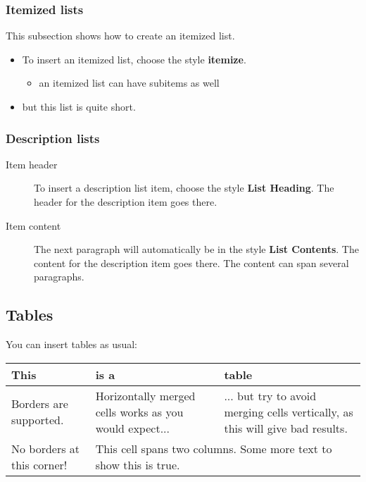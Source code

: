 \documentclass[12pt]{article}
\begin{document}
\subsubsection{Itemized lists}
This subsection shows how to create an itemized list.

\begin{itemize}
\item To insert an itemized list, choose the style \textbf{itemize}.

\begin{itemize}
\item an itemized list can have subitems as well
\end{itemize}
\item but this list is quite short.
\end{itemize}
\subsubsection{Description lists}
\begin{description}
\item[Item header]

To insert a description list item, choose the style \textbf{List
Heading}. The header for the description item goes there.

\item[Item content]

The next paragraph will automatically be in the style \textbf{List
Contents}. The content for the description item goes there. The content
can span several paragraphs.

\end{description}
\subsection{Tables}
You can insert tables as usual:

\begin{longtable}[l]{|p{3.799cm}|p{3.799cm}|p{3.797cm}|}
\hline
\textbf{This}
&
\textbf{is a}
&
\textbf{table}
\\\hline
\endhead
Borders are supported.
&
Horizontally merged cells works as you would expect...
&
... but try to avoid merging cells vertically, as this will give bad
results.
\\\hline
\multicolumn{1}{p{3.799cm}|}{No borders at this corner!
}&
\multicolumn{2}{p{7.7960005cm}|}{This cell spans two columns. Some more
text to show this is true.
}\\\cline{2-3}
\end{longtable}
\end{document}
